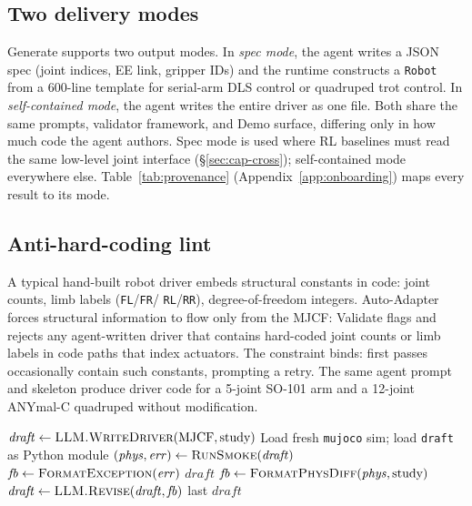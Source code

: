 \subsection{Two delivery modes}
\label{sec:modes}

Generate supports two output modes. In \emph{spec mode}, the
agent writes a JSON spec (joint indices, EE link, gripper IDs) and
the runtime constructs a \texttt{Robot} from a 600-line
template for serial-arm DLS control or quadruped trot control. In
\emph{self-contained mode}, the agent writes the entire driver as
one file. Both share the same prompts, validator framework, and Demo
surface, differing only in how much code the agent authors. Spec mode is used where RL baselines must read the same
low-level joint interface (\S\ref{sec:cap-cross});
self-contained mode everywhere else. Table~\ref{tab:provenance}
(Appendix~\ref{app:onboarding}) maps every result to its mode.

\subsection{Anti-hard-coding lint}

A typical hand-built robot driver embeds structural constants in
code: joint counts, limb labels (\texttt{FL}/\texttt{FR}/
\texttt{RL}/\texttt{RR}), degree-of-freedom integers.
Auto-Adapter forces structural information to flow only from the
MJCF: Validate flags and rejects any agent-written driver that
contains hard-coded joint counts or limb labels in code paths
that index actuators. The constraint binds: first passes occasionally
contain such constants, prompting a retry. The same agent prompt
and skeleton produce driver code for a 5-joint SO-101 arm and a
12-joint ANYmal-C quadruped without modification.

\begin{algorithm}[t]
\caption{Generate phase (per-robot inner loop). Returns a
candidate driver that has passed the inner smoke check; the
outer Validate phase (\S\ref{sec:pipeline}) re-checks
independently.}
\label{alg:generate}
\begin{algorithmic}[1]
\State $\mathit{draft} \gets \textsc{LLM.WriteDriver}(\text{MJCF}, \text{study})$
  \State Load fresh \texttt{mujoco} sim; load \texttt{draft} as Python module
  \State $(\mathit{phys}, \mathit{err}) \gets \textsc{RunSmoke}(\mathit{draft})$
    \State $\mathit{fb} \gets \textsc{FormatException}(\mathit{err})$
    \State \Return $\mathit{draft}$
  \Else
    \State $\mathit{fb} \gets \textsc{FormatPhysDiff}(\mathit{phys}, \text{study})$
  \EndIf
  \State $\mathit{draft} \gets \textsc{LLM.Revise}(\mathit{draft}, \mathit{fb})$
\EndFor
\State \Return last $\mathit{draft}$
\end{algorithmic}
\end{algorithm}
